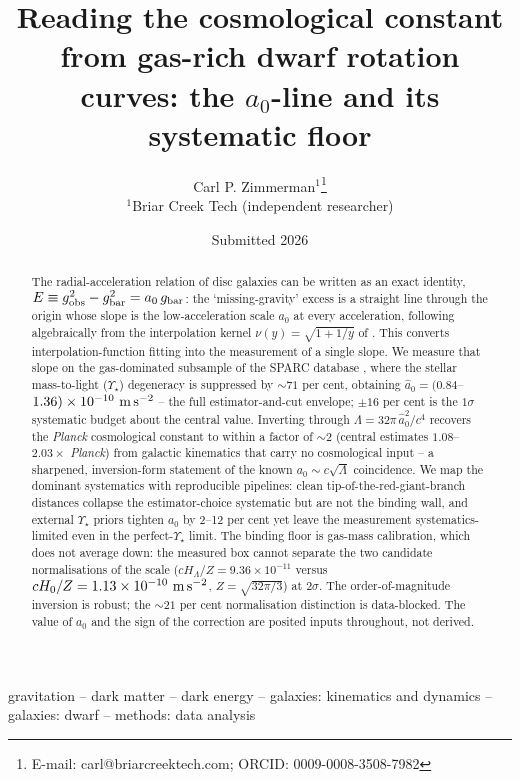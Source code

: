 \documentclass[fleqn,usenatbib]{mnras}
\title[The $a_0$-line and its systematic floor]{Reading the cosmological constant from gas-rich dwarf rotation curves: the $a_0$-line and its systematic floor}
\author[C. P. Zimmerman]{Carl P. Zimmerman$^{1}$\thanks{E-mail: carl@briarcreektech.com; ORCID: 0009-0008-3508-7982}
\\
$^{1}$Briar Creek Tech (independent researcher)
}
\date{Submitted 2026}
\begin{document}
\label{firstpage}
\pagerange{\pageref{firstpage}--\pageref{lastpage}}
\maketitle

\begin{abstract}
The radial-acceleration relation of disc galaxies can be written as an exact identity, $E \equiv g_{\rm obs}^2 - g_{\rm bar}^2 = a_0\,g_{\rm bar}$: the `missing-gravity' excess is a straight line through the origin whose slope is the low-acceleration scale $a_0$ at every acceleration, following algebraically from the interpolation kernel $\nu(y)=\sqrt{1+1/y}$ of \citet{Milgrom1999}. This converts interpolation-function fitting into the measurement of a single slope. We measure that slope on the gas-dominated subsample of the SPARC database \citep{Lelli2016}, where the stellar mass-to-light ($\Upsilon_\star$) degeneracy is suppressed by ${\sim}71$ per cent, obtaining $\hat a_0 = (0.84$--$1.36)\times10^{-10}\ {\rm m\,s^{-2}}$ -- the full estimator-and-cut envelope; $\pm16$ per cent is the $1\sigma$ systematic budget about the central value. Inverting through $\Lambda = 32\pi\,\hat a_0^2/c^4$ recovers the \textit{Planck} cosmological constant to within a factor of ${\sim}2$ (central estimates $1.08$--$2.03\times$ \textit{Planck}) from galactic kinematics that carry no cosmological input -- a sharpened, inversion-form statement of the known $a_0 \sim c\sqrt{\Lambda}$ coincidence. We map the dominant systematics with reproducible pipelines: clean tip-of-the-red-giant-branch distances collapse the estimator-choice systematic but are not the binding wall, and external $\Upsilon_\star$ priors tighten $a_0$ by 2--12 per cent yet leave the measurement systematics-limited even in the perfect-$\Upsilon_\star$ limit. The binding floor is gas-mass calibration, which does not average down: the measured box cannot separate the two candidate normalisations of the scale ($cH_\Lambda/Z = 9.36\times10^{-11}$ versus $cH_0/Z = 1.13\times10^{-10}\ {\rm m\,s^{-2}}$, $Z=\sqrt{32\pi/3}$) at $2\sigma$. The order-of-magnitude inversion is robust; the ${\sim}21$ per cent normalisation distinction is data-blocked. The value of $a_0$ and the sign of the correction are posited inputs throughout, not derived.
\end{abstract}

\begin{keywords}
gravitation -- dark matter -- dark energy -- galaxies: kinematics and dynamics -- galaxies: dwarf -- methods: data analysis
\end{keywords}
\end{document}
